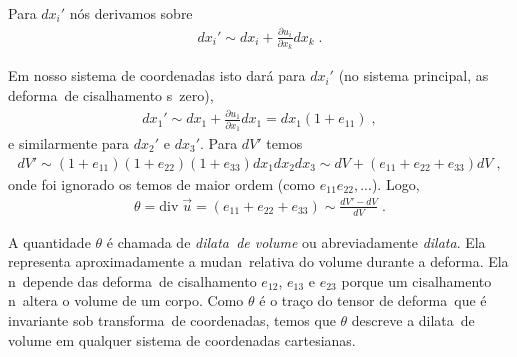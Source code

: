 Para $dx_i'$ n\'os derivamos sobre
\begin{eqnarray}
dx_i' \sim dx_i + \frac{\partial u_i}{\partial x_k} dx_k \; .
\end{eqnarray}

Em nosso sistema de coordenadas isto dar\'a para $dx_i'$
(no sistema principal, as deforma\coes\ de cisalhamento
s\ao\ zero),
\begin{eqnarray}
dx_1' \sim dx_1 + \frac{\partial u_1}{\partial x_1} dx_1
= dx_1(1+e_{11}) \;,
\end{eqnarray}
e similarmente para $dx_2'$ e $dx_3'$. Para $dV'$ temos
\begin{eqnarray}
dV' \sim (1+e_{11})(1+e_{22})(1+e_{33})dx_1 dx_2 dx_3
\sim dV + (e_{11} + e_{22} + e_{33}) dV \; ,
\end{eqnarray}
onde foi ignorado os temos de maior ordem (como
$e_{11}e_{22}, ...$). Logo,
\begin{eqnarray}
\theta = \mbox{div}\; \vec{u} = (e_{11} + e_{22} + e_{33})
\sim \frac{dV'-dV}{dV} \; .
\end{eqnarray}

A quantidade $\theta$ \'e chamada de {\it dilata\cao\ de
volume} ou abreviadamente {\it dilata\cao}. Ela representa
aproximadamente a mudan\ca\ relativa do volume durante a
deforma\cao. Ela n\ao\ depende das deforma\coes\ de cisalhamento
$e_{12}$, $e_{13}$ e $e_{23}$ porque um cisalhamento n\ao\ altera o
volume de um corpo. Como $\theta$ \'e o tra\c co do tensor de
deforma\cao\ que \'e invariante sob transforma\cao\ de
coordenadas, temos que $\theta$ descreve a dilata\cao\ 
de volume em qualquer sistema de coordenadas cartesianas.



